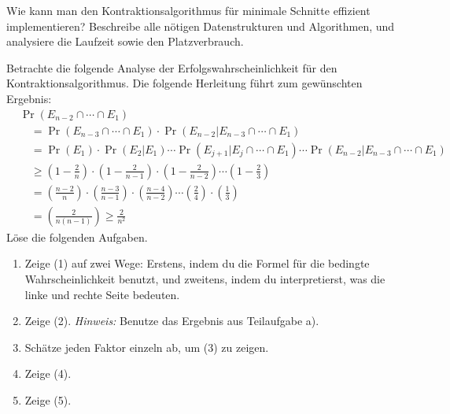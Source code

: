 \documentclass{uebung_cs}
\begin{document}
\begin{aufgabe}
	Wie kann man den Kontraktionsalgorithmus für minimale Schnitte effizient implementieren? Beschreibe alle nötigen Datenstrukturen und Algorithmen, und analysiere die Laufzeit sowie den Platzverbrauch.
\end{aufgabe}

\begin{aufgabe}
	Betrachte die folgende Analyse der Erfolgswahrscheinlichkeit für den Kontraktionsalgorithmus. Die folgende Herleitung führt zum gewünschten Ergebnis:
	\begin{align}
	&\nonumber\Pr(E_{n-2} \cap \cdots \cap E_1) \\
	&\quad= \Pr(E_{n-3} \cap \cdots \cap E_1) \cdot \Pr(E_{n-2}|E_{n-3} \cap \cdots \cap E_1) \\
	&\quad= \Pr(E_1) \cdot \Pr(E_2|E_1) \cdots \Pr(E_{j+1} | E_j \cap \cdots \cap E_1) \cdots \Pr(E_{n-2} | E_{n-3} \cap \cdots \cap E_1) \\
	&\quad\ge \left(1 - \frac{2}{n} \right) \cdot \left(1 - \frac{2}{n-1} \right) \cdot \left(1 - \frac{2}{n-2} \right) \cdots \left(1 - \frac{2}{3} \right) \\
	&\quad= \left(\frac{n-2}{n}\right) \cdot \left(\frac{n-3}{n-1}\right) \cdot \left(\frac{n-4}{n-2}\right) \cdots \left(\frac{2}{4}\right) \cdot \left(\frac{1}{3}\right) \\
	&\quad= \left(\frac{2}{n(n-1)}\right) \geq \frac{2}{n^2}
	\end{align}
	Löse die folgenden Aufgaben.
	\begin{enumerate}
		\item Zeige (1) auf zwei Wege: Erstens, indem du die Formel für die bedingte Wahrscheinlichkeit benutzt, und zweitens, indem du interpretierst, was die linke und rechte Seite bedeuten.
		\item Zeige (2). \textit{Hinweis:} Benutze das Ergebnis aus Teilaufgabe a).
		\item Schätze jeden Faktor einzeln ab, um (3) zu zeigen. 
		\item Zeige (4).
		\item Zeige (5).
	\end{enumerate}
\end{aufgabe}
\end{document}
